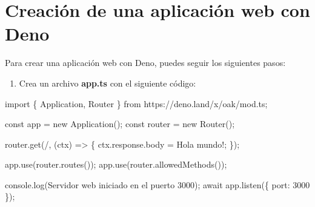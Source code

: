 \documentclass[
  a4paper,
  DIV=11,
  numbers=noendperiod,
  onepage,
  openany]{scrreprt}
\newenvironment{Shaded}{\begin{snugshade}}{\end{snugshade}}
\newcommand{\AttributeTok}[1]{\textcolor[rgb]{0.40,0.45,0.13}{#1}}
\newcommand{\BuiltInTok}[1]{\textcolor[rgb]{0.00,0.23,0.31}{#1}}
\newcommand{\ControlFlowTok}[1]{\textcolor[rgb]{0.00,0.23,0.31}{#1}}
\newcommand{\DecValTok}[1]{\textcolor[rgb]{0.68,0.00,0.00}{#1}}
\newcommand{\FunctionTok}[1]{\textcolor[rgb]{0.28,0.35,0.67}{#1}}
\newcommand{\ImportTok}[1]{\textcolor[rgb]{0.00,0.46,0.62}{#1}}
\newcommand{\KeywordTok}[1]{\textcolor[rgb]{0.00,0.23,0.31}{#1}}
\newcommand{\NormalTok}[1]{\textcolor[rgb]{0.00,0.23,0.31}{#1}}
\newcommand{\OperatorTok}[1]{\textcolor[rgb]{0.37,0.37,0.37}{#1}}
\newcommand{\StringTok}[1]{\textcolor[rgb]{0.13,0.47,0.30}{#1}}
\providecommand{\tightlist}{%
  \setlength{\itemsep}{0pt}\setlength{\parskip}{0pt}}\usepackage{longtable,booktabs,array}
\begin{document}
\section{Creación de una aplicación web con
Deno}\label{creaciuxf3n-de-una-aplicaciuxf3n-web-con-deno}

Para crear una aplicación web con Deno, puedes seguir los siguientes
pasos:

\begin{enumerate}
\def\labelenumi{\arabic{enumi}.}
\tightlist
\item
  Crea un archivo \textbf{app.ts} con el siguiente código:
\end{enumerate}

\begin{Shaded}
\begin{Highlighting}[]
\ImportTok{import}\NormalTok{ \{ Application}\OperatorTok{,}\NormalTok{ Router \} }\ImportTok{from} \StringTok{\textquotesingle{}https://deno.land/x/oak/mod.ts\textquotesingle{}}\OperatorTok{;}

\KeywordTok{const}\NormalTok{ app }\OperatorTok{=} \KeywordTok{new} \FunctionTok{Application}\NormalTok{()}\OperatorTok{;}
\KeywordTok{const}\NormalTok{ router }\OperatorTok{=} \KeywordTok{new} \FunctionTok{Router}\NormalTok{()}\OperatorTok{;}

\NormalTok{router}\OperatorTok{.}\FunctionTok{get}\NormalTok{(}\StringTok{\textquotesingle{}/\textquotesingle{}}\OperatorTok{,}\NormalTok{ (ctx) }\KeywordTok{=\textgreater{}}\NormalTok{ \{}
\NormalTok{  ctx}\OperatorTok{.}\AttributeTok{response}\OperatorTok{.}\AttributeTok{body} \OperatorTok{=} \StringTok{\textquotesingle{}Hola mundo!\textquotesingle{}}\OperatorTok{;}
\NormalTok{\})}\OperatorTok{;}

\NormalTok{app}\OperatorTok{.}\FunctionTok{use}\NormalTok{(router}\OperatorTok{.}\FunctionTok{routes}\NormalTok{())}\OperatorTok{;}
\NormalTok{app}\OperatorTok{.}\FunctionTok{use}\NormalTok{(router}\OperatorTok{.}\FunctionTok{allowedMethods}\NormalTok{())}\OperatorTok{;}

\BuiltInTok{console}\OperatorTok{.}\FunctionTok{log}\NormalTok{(}\StringTok{\textquotesingle{}Servidor web iniciado en el puerto 3000\textquotesingle{}}\NormalTok{)}\OperatorTok{;}
\ControlFlowTok{await}\NormalTok{ app}\OperatorTok{.}\FunctionTok{listen}\NormalTok{(\{ port}\OperatorTok{:} \DecValTok{3000}\NormalTok{ \})}\OperatorTok{;}
\end{Highlighting}
\end{Shaded}
\end{document}
